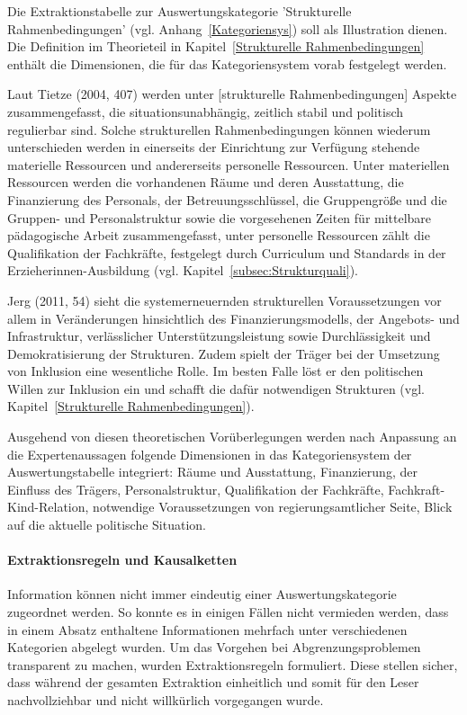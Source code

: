 Die Extraktionstabelle zur Auswertungskategorie 'Strukturelle Rahmenbedingungen' (vgl. Anhang~\ref{Kategoriensys}) soll als Illustration dienen. 
Die Definition im Theorieteil in Kapitel~\ref{Strukturelle Rahmenbedingungen} enthält die Dimensionen, die für das Kategoriensystem vorab festgelegt werden. 

\begin{zitat}
Laut Tietze (2004, 407) werden unter [strukturelle Rahmenbedingungen] Aspekte zusammengefasst, die situationsunabhängig, zeitlich stabil und politisch regulierbar sind. Solche strukturellen Rahmenbedingungen können wiederum unterschieden werden in einerseits der Einrichtung zur Verfügung stehende materielle Ressourcen und andererseits personelle Ressourcen. Unter materiellen Ressourcen werden die vorhandenen Räume und deren Ausstattung, die Finanzierung des Personals, der Betreuungsschlüssel, die Gruppengröße und die Gruppen- und Personalstruktur sowie die vorgesehenen Zeiten für mittelbare pädagogische Arbeit zusammengefasst, unter personelle Ressourcen zählt die Qualifikation der Fachkräfte, festgelegt durch Curriculum und Standards in der Erzieherinnen-Ausbildung (vgl. Kapitel~\ref{subsec:Strukturquali}). 

Jerg (2011, 54) sieht die systemerneuernden strukturellen Voraussetzungen vor allem in Veränderungen hinsichtlich des Finanzierungsmodells, der Angebots- und Infrastruktur, verlässlicher Unterstützungsleistung sowie Durchlässigkeit und Demokratisierung der Strukturen. Zudem spielt der Träger bei der Umsetzung von Inklusion eine wesentliche Rolle. Im besten Falle löst er den politischen Willen zur Inklusion ein und schafft die dafür notwendigen Strukturen (vgl. Kapitel~\ref{Strukturelle Rahmenbedingungen}). 
\end{zitat}

Ausgehend von diesen theoretischen Vorüberlegungen werden nach Anpassung an die Expertenaussagen folgende Dimensionen in das Kategoriensystem der Auswertungstabelle integriert:  
Räume und Ausstattung, Finanzierung, der Einfluss des Trägers, Personalstruktur, Qualifikation der Fachkräfte, Fachkraft-Kind-Relation, notwendige Voraussetzungen von regierungsamtlicher Seite, Blick auf die aktuelle politische Situation.
 
\paragraph{Extraktionsregeln und Kausalketten} Information können nicht immer eindeutig einer Auswertungskategorie zugeordnet werden. So konnte es in einigen Fällen nicht vermieden werden, dass in einem Absatz enthaltene Informationen mehrfach unter verschiedenen Kategorien abgelegt wurden. Um das Vorgehen bei Abgrenzungsproblemen transparent zu machen, wurden Extraktionsregeln formuliert. Diese stellen sicher, dass während der gesamten Extraktion einheitlich und somit für den Leser nachvollziehbar und nicht willkürlich vorgegangen wurde. 


